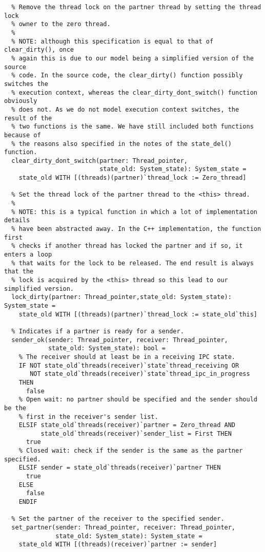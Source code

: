 \begin{lstlisting}
  % Remove the thread lock on the partner thread by setting the thread lock
  % owner to the zero thread.
  %
  % NOTE: although this specification is equal to that of clear_dirty(), once
  % again this is due to our model being a simplified version of the source 
  % code. In the source code, the clear_dirty() function possibly switches the
  % execution context, whereas the clear_dirty_dont_switch() function obviously
  % does not. As we do not model execution context switches, the result of the
  % two functions is the same. We have still included both functions because of 
  % the reasons also specified in the notes of the state_del() function.
  clear_dirty_dont_switch(partner: Thread_pointer, 
                          state_old: System_state): System_state =
    state_old WITH [(threads)(partner)`thread_lock := Zero_thread]

  % Set the thread lock of the partner thread to the <this> thread.
  %
  % NOTE: this is a typical function in which a lot of implementation details
  % have been abstracted away. In the C++ implementation, the function first
  % checks if another thread has locked the partner and if so, it enters a loop
  % that waits for the lock to be released. The end result is always that the
  % lock is acquired by the <this> thread so this lead to our simplified version.
  lock_dirty(partner: Thread_pointer,state_old: System_state): System_state =
    state_old WITH [(threads)(partner)`thread_lock := state_old`this]

  % Indicates if a partner is ready for a sender.
  sender_ok(sender: Thread_pointer, receiver: Thread_pointer,
            state_old: System_state): bool =
    % The receiver should at least be in a receiving IPC state.
    IF NOT state_old`threads(receiver)`state`thread_receiving OR
       NOT state_old`threads(receiver)`state`thread_ipc_in_progress
    THEN
      false
    % Open wait: no partner should be specified and the sender should be the 
    % first in the receiver's sender list.
    ELSIF state_old`threads(receiver)`partner = Zero_thread AND
          state_old`threads(receiver)`sender_list = First THEN 
      true
    % Closed wait: check if the sender is the same as the partner specified.
    ELSIF sender = state_old`threads(receiver)`partner THEN
      true
    ELSE
      false
    ENDIF

  % Set the partner of the receiver to the specified sender.
  set_partner(sender: Thread_pointer, receiver: Thread_pointer,
              state_old: System_state): System_state =
    state_old WITH [(threads)(receiver)`partner := sender]
  

\end{lstlisting}
